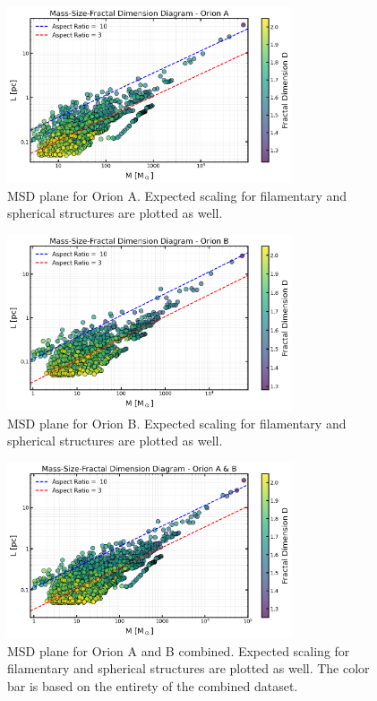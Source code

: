 \begin{figure}[t]
    \centering
    \includegraphics[width=0.75\textwidth]{figures/MSD_Orion_A.png}
    \caption{MSD plane for Orion A. Expected scaling for filamentary and spherical structures are plotted as well.}
    \label{fig:MSD_orion_A}
\end{figure}

\begin{figure}[t]
    \centering
    \includegraphics[width=0.75\textwidth]{figures/MSD_Orion_B.png}
    \caption{MSD plane for Orion B. Expected scaling for filamentary and spherical structures are plotted as well.}
    \label{fig:MSD_orion_B}
\end{figure}

\begin{figure}[t]
    \centering
    \includegraphics[width=0.75\textwidth]{figures/MSD_Orion_A_B.png}
    \caption{MSD plane for Orion A and B combined. Expected scaling for filamentary and spherical structures are plotted as well. The color bar is based on the entirety of the combined dataset.}
    \label{fig:MSD_orion_A_B}
\end{figure}

